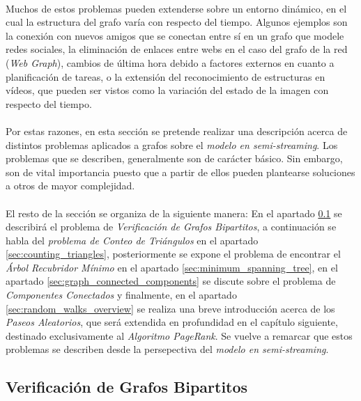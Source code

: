 \documentclass{subfiles}
\begin{document}
      \paragraph{}
      Muchos de estos problemas pueden extenderse sobre un entorno dinámico, en el cual la estructura del grafo varía con respecto del tiempo. Algunos ejemplos son la conexión con nuevos amigos que se conectan entre sí en un grafo que modele redes sociales, la eliminación de enlaces entre webs en el caso del grafo de la red (\emph{Web Graph}), cambios de última hora debido a factores externos en cuanto a planificación de tareas, o la extensión del reconocimiento de estructuras en vídeos, que pueden ser vistos como la variación del estado de la imagen con respecto del tiempo.

      \paragraph{}
      Por estas razones, en esta sección se pretende realizar una descripción acerca de distintos problemas aplicados a grafos sobre el \emph{modelo en semi-streaming}. Los problemas que se describen, generalmente son de carácter básico. Sin embargo, son de vital importancia puesto que a partir de ellos pueden plantearse soluciones a otros de mayor complejidad.

      \paragraph{}
      El resto de la sección se organiza de la siguiente manera: En el apartado \ref{sec:bipartite_matchings} se describirá el problema de \emph{Verificación de Grafos Bipartitos}, a continuación se habla del \emph{problema de Conteo de Triángulos} en el apartado \ref{sec:counting_triangles}, posteriormente se expone el problema de encontrar el \emph{Árbol Recubridor Mínimo} en el apartado \ref{sec:minimum_spanning_tree}, en el apartado \ref{sec:graph_connected_components} se discute sobre el problema de \emph{Componentes Conectados} y finalmente, en el apartado \ref{sec:random_walks_overview} se realiza una breve introducción acerca de los \emph{Paseos Aleatorios}, que será extendida en profundidad en el capítulo siguiente, destinado exclusivamente al \emph{Algoritmo PageRank}. Se vuelve a remarcar que estos problemas se describen desde la persepectiva del \emph{modelo en semi-streaming}.

      \subsection{Verificación de Grafos Bipartitos}
      \label{sec:bipartite_matchings}
\end{document}

